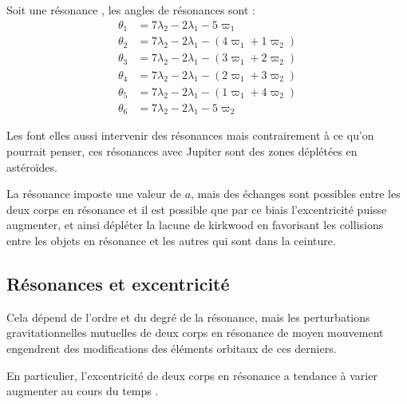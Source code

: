 \begin{exemple}
Soit une résonance , les angles de résonances sont :
\begin{align*}
\theta_1 &= 7 \lambda_2 -2\lambda_1 - 5 \varpi_1\\
\theta_2 &= 7 \lambda_2 -2\lambda_1 - \left( 4 \varpi_1 + 1\varpi_2 \right)\\
\theta_3 &= 7 \lambda_2 -2\lambda_1 - \left( 3 \varpi_1 + 2\varpi_2 \right)\\
\theta_4 &= 7 \lambda_2 -2\lambda_1 - \left( 2 \varpi_1 + 3\varpi_2 \right)\\
\theta_5 &= 7 \lambda_2 -2\lambda_1 - \left( 1 \varpi_1 + 4\varpi_2 \right)\\
\theta_6 &= 7 \lambda_2 -2\lambda_1 - 5 \varpi_2
\end{align*}
\end{exemple}

\begin{remarque}
Les  font elles aussi intervenir des résonances mais contrairement à ce qu'on pourrait penser, ces résonances avec Jupiter sont des zones déplétées en astéroïdes. 

La résonance imposte une valeur de $a$, mais des échanges sont possibles entre les deux corps en résonance et il est possible que par ce biais l'excentricité puisse augmenter, et ainsi dépléter la lacune de kirkwood en favorisant les collisions entre les objets en résonance et les autres qui sont dans la ceinture.
\end{remarque}


\subsection{Résonances et excentricité}
Cela dépend de l'ordre et du degré de la résonance, mais les perturbations gravitationnelles mutuelles de deux corps en résonance de moyen mouvement engendrent des modifications des éléments orbitaux de ces derniers. 

En particulier, l'excentricité de deux corps en résonance a tendance à varier augmenter au cours du temps \citep[eq. (8.29)]{murray2000solar}. 

